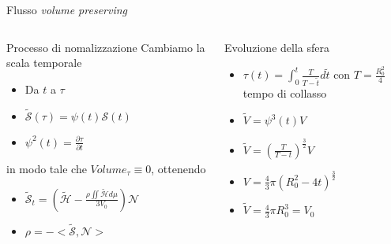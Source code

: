 \begin{frame}{Flusso \emph{volume preserving}}
  \begin{columns}[T]
    \begin{column}{6cm}
      \begin{block}{Processo di nomalizzazione}
        Cambiamo la scala temporale
        \begin{itemize}
        \item Da $t$ a $\tau$
        \item $\mathcal{\tilde{S}(\tau)}=\psi(t)\mathcal{S}(t)$ 
        \item $\psi^2(t)=\frac{\partial\tau}{\partial t}$
        \end{itemize}
         in modo tale che \alert{$Volume_{\tau}\equiv 0$}, ottenendo   
         \begin{itemize}
         \item $\mathcal{\tilde{S}}_t=\left(\mathcal{\tilde{H}}-\frac{\rho\iint\mathcal{\tilde{H}}d\mu}{3V_0}\right)\mathcal{N}$
         \item $\rho =-<\mathcal{\tilde{S}},\mathcal{N}>$
         \end{itemize}
      \end{block}
    \end{column}
    \begin{column}[T]{4cm}
      \begin{exampleblock}{Evoluzione della sfera}
        \begin{itemize}
        \item $\tau(t)=\int_0^t\frac{T}{T-\tilde{t}}d\tilde{t}$ con
          $T=\frac{R_0^2}{4}$ tempo di 
          collasso
        \item $\tilde{V}=\psi^3(t)V$
        \item $\tilde{V}=\left(\frac{T}{T-t}\right)^{\frac{3}{2}}V$
        \item $V=\frac{4}{3}\pi(R_0^2-4t)^{\frac{3}{2}}$
        \item $\tilde{V}=\frac{4}{3}\pi R_0^3=V_0$
        \end{itemize}
      \end{exampleblock}
    \end{column}
  \end{columns}
\end{frame}
